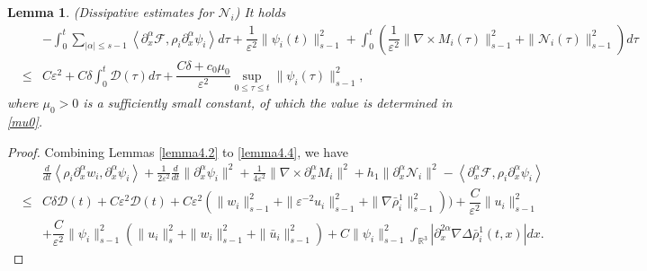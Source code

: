 \documentclass[reqno,twoside,12pt,a4paper]{amsart}
\newcommand{\eps}{\mathbb{\varepsilon}}
\newcommand{\al}{\alpha}
\newcommand{\pa}{\partial}
\newcommand{\D}{\nabla}
\newcommand{\calf}{\mathcal{F}}
\newcommand{\Ni}{\mathcal{N}_i}
\newtheorem{lemma}{Lemma}[section]
\numberwithin{equation}{section}
\begin{document}
\begin{lemma}(Dissipative estimates for $\Ni$) It holds
\begin{eqnarray}\label{Nifinal}
&&-\int_0^t\sum_{|\al|\leq s-1}\left\langle \pa_x^\al \calf, \rho_i \partial^\al_x \psi_i\right\rangle d\tau+\dfrac{1}{\eps^2}\|\psi_i(t)\|_{s-1}^2+\int_0^t\left(\dfrac{1}{\eps^2}\|\D\times M_i(\tau)\|_{s-1}^2+\|\Ni(\tau)\|_{s-1}^2\right)d\tau\nonumber\\
&\leq& C\eps^2+C\delta\int_0^t\mathcal{D}(\tau)d\tau+\dfrac{C\delta+c_0\mu_0}{\eps^2}\sup_{0\leq \tau \leq t}\|\psi_i(\tau)\|_{s-1}^2,
\end{eqnarray}
where $\mu_0>0$ is a sufficiently small constant, of which the value is determined in \eqref{mu0}.
\end{lemma}
\begin{proof}
Combining Lemmas \ref{lemma4.2} to \ref{lemma4.4}, we have
\begin{eqnarray}\label{ifinalbefore}
&&\frac{d}{dt} \left\langle \rho_i \partial^\al_x w_i, \partial^\al_x \psi_i \right\rangle+\frac{1}{2\eps^2} \frac{d}{dt} \|\partial^\al_x \psi_i\|^2+\frac{1}{4\eps^2} \|\nabla \times \partial^\al_x M_i\|^2+h_1 \|\partial^\al_x \Ni\|^2 - \left\langle \pa_x^\al \calf, \rho_i \partial^\al_x \psi_i\right\rangle\nonumber\\
&\leq& C\delta\mathcal{D}(t)+C\eps^2\mathcal{D}(t)+C\eps^2(\|w_i\|_{s-1}^2+\|\eps^{-2}u_i\|_{s-1}^2+\|\D\bar{\rho}_i^1\|_{s-1}^2))+ \dfrac{C}{\eps^2} \|u_i\|_{s-1}^2 \nonumber\\
&& + \dfrac{C}{\eps^2}\|\psi_i\|_{s-1}^2 \left(\|u_i\|_s^2 +\|w_i\|_{s-1}^2+\|\bar{u}_i\|^2_{s-1} \right) + C \|\psi_i\|_{s-1}^2 \int_{\mathbb{R}^3} |\pa_x^{2\al} \D \Delta \bar{\rho}^1_i (t,x)| dx .
\end{eqnarray}



\end{proof}
\end{document}
